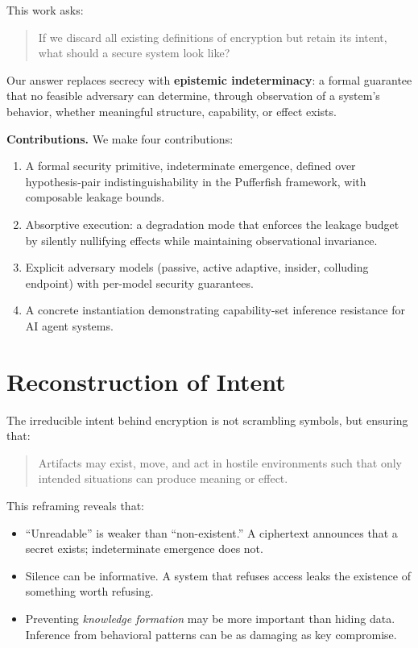 \documentclass[11pt,a4paper]{article}
\begin{document}
This work asks:

\begin{quote}
If we discard all existing definitions of encryption but retain its intent, what should a secure system look like?
\end{quote}

Our answer replaces secrecy with \textbf{epistemic indeterminacy}: a formal guarantee that no feasible adversary can determine, through observation of a system's behavior, whether meaningful structure, capability, or effect exists.

\textbf{Contributions.} We make four contributions:

\begin{enumerate}
  \item A formal security primitive, indeterminate emergence, defined over hypothesis-pair indistinguishability in the Pufferfish framework, with composable leakage bounds.
  \item Absorptive execution: a degradation mode that enforces the leakage budget by silently nullifying effects while maintaining observational invariance.
  \item Explicit adversary models (passive, active adaptive, insider, colluding endpoint) with per-model security guarantees.
  \item A concrete instantiation demonstrating capability-set inference resistance for AI agent systems.
\end{enumerate}

\section{Reconstruction of Intent}

The irreducible intent behind encryption is not scrambling symbols, but ensuring that:

\begin{quote}
Artifacts may exist, move, and act in hostile environments such that only intended situations can produce meaning or effect.
\end{quote}

This reframing reveals that:

\begin{itemize}
  \item ``Unreadable'' is weaker than ``non-existent.'' A ciphertext announces that a secret exists; indeterminate emergence does not.
  \item Silence can be informative. A system that refuses access leaks the existence of something worth refusing.
  \item Preventing \textit{knowledge formation} may be more important than hiding data. Inference from behavioral patterns can be as damaging as key compromise.
\end{itemize}
\end{document}
